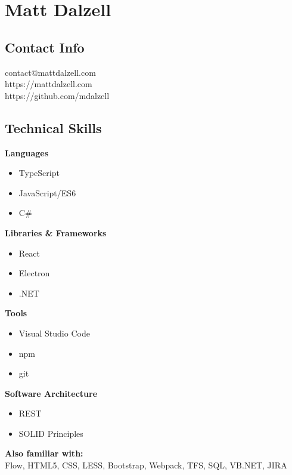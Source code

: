 \documentclass[12pt]{article}
\begin{document}

\section*{Matt Dalzell}

\setlength{\columnsep}{4em}
\setlength{\columnseprule}{0.1pt}
\begin{paracol}{2}

\subsection*{Contact Info}
contact@mattdalzell.com \\ 
https://mattdalzell.com \\
https://github.com/mdalzell

\subsection*{Technical Skills} 

\textbf{Languages}
\begin{itemize}
    \item TypeScript 
    \item JavaScript/ES6
    \item C\#
\end{itemize}

\noindent \textbf{Libraries \& Frameworks}
\begin{itemize}
    \item React 
    \item Electron
    \item .NET 
\end{itemize}

\noindent \textbf{Tools}
\begin{itemize}
    \item Visual Studio Code
    \item npm
    \item git
\end{itemize}

\noindent \textbf{Software Architecture}
\begin{itemize}
    \item REST
    \item SOLID Principles
\end{itemize}

\noindent \textbf{Also familiar with:}\\
Flow, HTML5, CSS, LESS, Bootstrap, Webpack, TFS, SQL, VB.NET, JIRA


\end{paracol}
\end{document}
